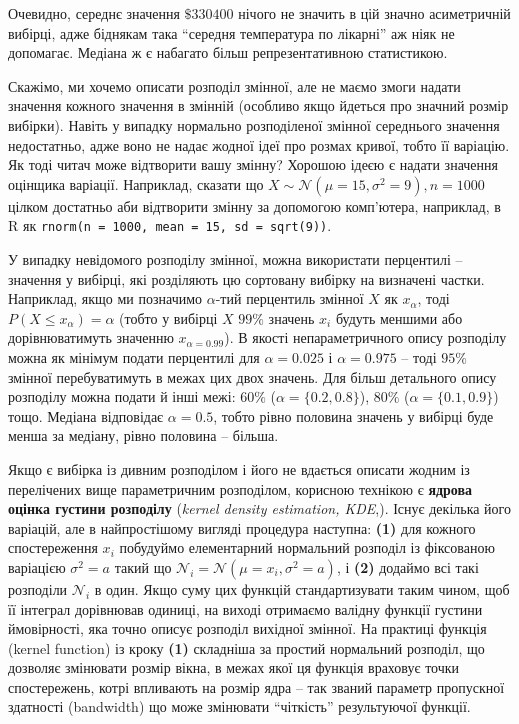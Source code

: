 \documentclass[
  11pt,
]{book}
\begin{document}
Очевидно, середнє значення \(\$330400\) нічого не значить в цій значно асиметричній вибірці, адже біднякам така ``середня температура по лікарні'' аж ніяк не допомагає. Медіана ж є набагато більш репрезентативною статистикою.

Скажімо, ми хочемо описати розподіл змінної, але не маємо змоги надати значення кожного значення в змінній (особливо якщо йдеться про значний розмір вибірки). Навіть у випадку нормально розподіленої змінної середнього значення недостатньо, адже воно не надає жодної ідеї про розмах кривої, тобто її варіацію. Як тоді читач може відтворити вашу змінну? Хорошою ідеєю є надати значення оцінщика варіації. Наприклад, сказати що \(X \sim \mathcal{N}(\mu = 15, \sigma^2 = 9), n = 1000\) цілком достатньо аби відтворити змінну за допомогою комп'ютера, наприклад, в R як \texttt{rnorm(n\ =\ 1000,\ mean\ =\ 15,\ sd\ =\ sqrt(9))}.

У випадку невідомого розподілу змінної, можна використати перцентилі -- значення у вибірці, які розділяють цю сортовану вибірку на визначені частки. Наприклад, якщо ми позначимо \(\alpha\)-тий перцентиль змінної \(X\) як \(x_{\alpha}\), тоді \(P(X \leq x_{\alpha}) = \alpha\) (тобто у вибірці \(X\) \(99\%\) значень \(x_i\) будуть меншими або дорівнюватимуть значенню \(x_{\alpha = 0.99}\)). В якості непараметричного опису розподілу можна як мінімум подати перцентилі для \(\alpha = 0.025\) і \(\alpha = 0.975\) -- тоді \(95\%\) змінної перебуватимуть в межах цих двох значень. Для більш детального опису розподілу можна подати й інші межі: \(60 \%\) (\(\alpha = \{0.2, 0.8\}\)), \(80 \%\) (\(\alpha = \{0.1, 0.9\}\)) тощо. Медіана відповідає \(\alpha = 0.5\), тобто рівно половина значень у вибірці буде менша за медіану, рівно половина -- більша.

Якщо є вибірка із дивним розподілом і його не вдається описати жодним із перелічених вище параметричним розподілом, корисною технікою є \textbf{ядрова оцінка густини розподілу} (\emph{kernel density estimation, KDE},). Існує декілька його варіацій, але в найпростішому вигляді процедура наступна: \textbf{(1)} для кожного спостереження \(x_i\) побудуймо елементарний нормальний розподіл із фіксованою варіацією \(\sigma^2 = a\) такий що \(\mathcal{N}_i = \mathcal{N}(\mu = x_i, \sigma^2 = a)\), і \textbf{(2)} додаймо всі такі розподіли \(\mathcal{N}_i\) в один. Якщо суму цих функцій стандартизувати таким чином, щоб її інтеграл дорівнював одиниці, на виході отримаємо валідну функції густини ймовірності, яка точно описує розподіл вихідної змінної. На практиці функція (kernel function) із кроку \textbf{(1)} складніша за простий нормальний розподіл, що дозволяє змінювати розмір вікна, в межах якої ця функція враховує точки спостережень, котрі впливають на розмір ядра -- так званий параметр пропускної здатності (bandwidth) що може змінювати ``чіткість'' результуючої функції.
\end{document}

